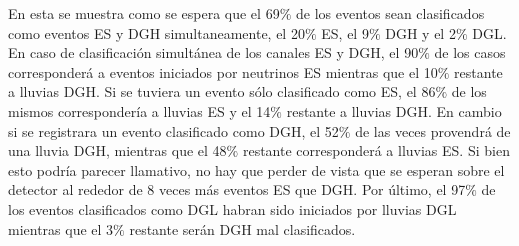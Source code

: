 	En esta se muestra como se espera que el 69$\%$ de los eventos sean clasificados como eventos ES y DGH simultaneamente, el 20$\%$ ES, el 9$\%$ DGH y el 2$\%$ DGL.
	En caso de clasificación simultánea de los canales ES y DGH, el 90$\%$ de los casos corresponderá a eventos iniciados por neutrinos ES mientras que el 10$\%$ restante a lluvias DGH. 
	Si se tuviera un evento sólo clasificado como ES, el 86$\%$ de los mismos correspondería a lluvias ES y el 14$\%$ restante a lluvias DGH.
	En cambio si se registrara un evento clasificado como DGH, el 52$\%$ de las veces provendrá de una lluvia DGH, mientras que el 48$\%$ restante corresponderá a lluvias ES. 
	Si bien esto podría parecer llamativo, no hay que perder de vista que se esperan sobre el detector al rededor de 8 veces más eventos ES que DGH.
	Por último, el 97$\%$ de los eventos clasificados como DGL habran sido iniciados por lluvias DGL mientras que el 3$\%$ restante serán DGH mal clasificados.
	
	
%	
% 
% 
	
